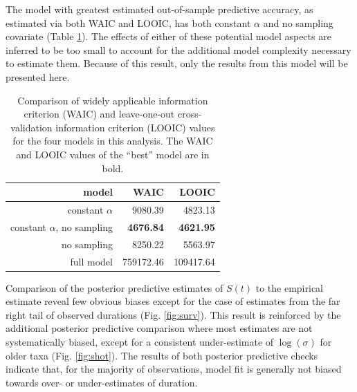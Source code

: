 \documentclass{article}
\begin{document}
The model with greatest estimated out-of-sample predictive accuracy, as estimated via both WAIC and LOOIC, has both constant \(\alpha\) and no sampling covariate (Table \ref{tab:comparison}). The effects of either of these potential model aspects are inferred to be too small to account for the additional model complexity necessary to estimate them. Because of this result, only the results from this model will be presented here. 
\begin{table}[ht]
  \centering
  \caption{Comparison of widely applicable information criterion (WAIC) and leave-one-out cross-validation information criterion (LOOIC) values for the four models in this analysis. The WAIC and LOOIC values of the ``best'' model are in bold.}
  \begin{tabular}{ r r r }
    \hline
    model & \uppercase{waic} & \uppercase{looic} \\ 
    \hline
    constant \(\alpha\) & 9080.39 & 4823.13 \\ 
    constant \(\alpha\), no sampling & \textbf{4676.84} & \textbf{4621.95} \\ 
    no sampling & 8250.22 & 5563.97 \\ 
    full model & 759172.46 & 109417.64 \\ 
    \hline
  \end{tabular}
  \label{tab:comparison}
\end{table}

Comparison of the posterior predictive estimates of \(S(t)\) to the empirical estimate reveal few obvious biases except for the case of estimates from the far right tail of observed durations (Fig. \ref{fig:surv}). This result is reinforced by the additional posterior predictive comparison where most estimates are not systematically biased, except for a consistent under-estimate of \(\log(\sigma)\) for older taxa (Fig. \ref{fig:shot}). The results of both posterior predictive checks indicate that, for the majority of observations, model fit is generally not biased towards over- or under-estimates of duration.
\end{document}

